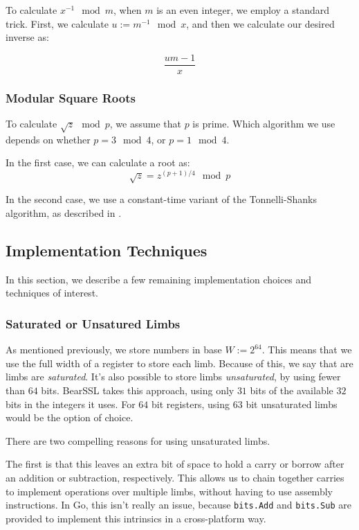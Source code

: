 \documentclass[11pt, a4paper]{article} %
\begin{document}
{To calculate $x^{-1} \mod m$, when $m$ is an even integer,
we employ a standard trick. First, we calculate
$u := m^{-1} \mod x$, and then we calculate our desired inverse as:

$$
\frac{um - 1}{x}
$$

\subsubsection{Modular Square Roots}

To calculate $\sqrt{z} \mod p$, we assume that $p$ is prime.
Which algorithm we use depends on whether $p = 3 \mod 4$,
or $p = 1 \mod 4$.

In the first case, we can calculate a root as:
$$
\sqrt{z} = z^{(p + 1) / 4} \mod p
$$

In the second case, we use a constant-time variant
of the Tonnelli-Shanks algorithm, as described in 
\cite{wahby_hashing_nodate}.

\subsection{Implementation Techniques}

In this section, we describe a few remaining implementation choices
and techniques of interest.

\subsubsection{Saturated or Unsatured Limbs}

As mentioned previously, we store numbers in base
$W := 2^{64}$. This means that we use the full width of a register
to store each limb. Because of this, we say that are limbs
are \emph{saturated}. It's also possible to store
limbs \emph{unsaturated}, by using fewer than $64$ bits.
BearSSL 
\cite{pornin_bearssl_2020-1}
takes this approach, using only $31$ bits of the available $32$ bits
in the integers it uses. For $64$ bit registers, using $63$ bit unsaturated
limbs would be the option of choice.

There are two compelling reasons for using unsaturated limbs.

The first is that this leaves an extra bit of space to hold a carry
or borrow after an addition or subtraction, respectively. This allows
us to chain together carries to implement operations over multiple
limbs, without having to use assembly instructions. In Go,
this isn't really an issue, because \texttt{bits.Add} and
\texttt{bits.Sub} are provided to implement this intrinsics
in a cross-platform way.

}
\end{document}
